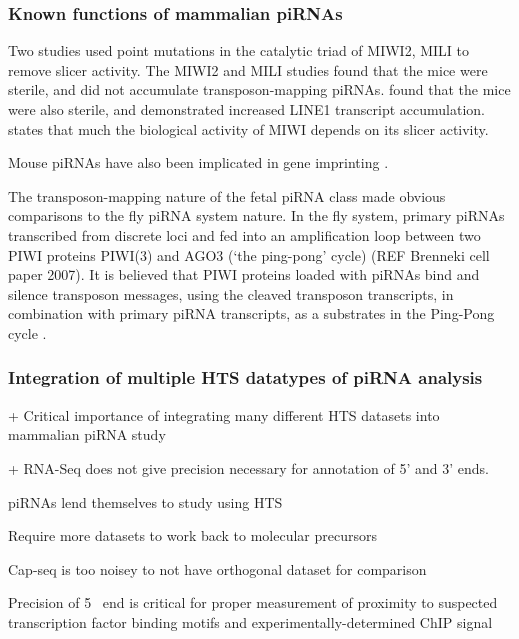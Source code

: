     \subsubsection{Known functions of mammalian piRNAs}

      Two studies \citep{DeFazio2011,Reuter2011} used point mutations in the catalytic triad of MIWI2, MILI to remove slicer activity. The MIWI2 and MILI studies found that the mice were sterile, and did not accumulate transposon-mapping piRNAs. \citet{DeFazio2011} found that the mice were also sterile, and demonstrated increased LINE1 transcript accumulation.  \citet{Reuter2011} states that much the biological activity of MIWI depends on its slicer activity.

      Mouse piRNAs have also been implicated in gene imprinting \citep{Watanabe2011}. 

      The transposon-mapping nature of the fetal piRNA class made obvious comparisons to the fly piRNA system nature. In the fly system, primary piRNAs transcribed from discrete loci and fed into an amplification loop between two PIWI proteins PIWI(3) and AGO3 (‘the ping-pong’ cycle) (REF Brenneki cell paper 2007). It is believed that PIWI proteins loaded with piRNAs bind and silence transposon messages, using the cleaved transposon transcripts, in combination with primary piRNA transcripts, as a substrates in the Ping-Pong cycle . 

    \subsubsection{Integration of multiple HTS datatypes of piRNA analysis}
      

      + Critical importance of integrating many different HTS datasets into mammalian piRNA study
      
      + RNA-Seq does not give precision necessary for annotation of 5' and 3' ends.
      
      piRNAs lend themselves to study using HTS
      
      Require more datasets to work back to molecular precursors

      Cap-seq is too noisey to not have orthogonal dataset for comparison
      
      Precision of 5\textprime~ end is critical for proper measurement of proximity to suspected transcription factor binding motifs and experimentally-determined ChIP signal
    
